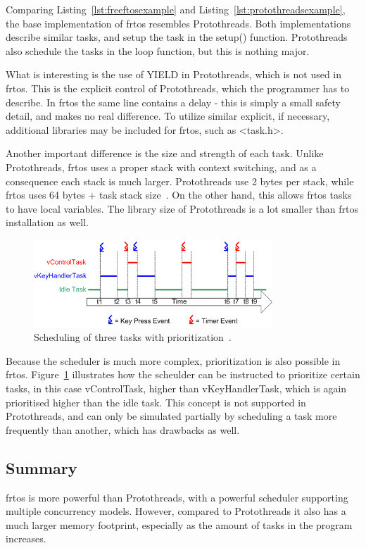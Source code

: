 Comparing Listing~\ref{lst:freeftosexample} and Listing~\ref{lst:protothreadsexample}, the base implementation of \gls{frtos} resembles Protothreads. Both implementations describe similar tasks, and setup the task in the setup() function. Protothreads also schedule the tasks in the loop function, but this is nothing major.

What is interesting is the use of YIELD in Protothreads, which is not used in \gls{frtos}. This is the explicit control of Protothreads, which the programmer has to describe. In \gls{frtos} the same line contains a delay - this is simply a small safety detail, and makes no real difference. To utilize similar explicit, if necessary, additional libraries may be included for \gls{frtos}, such as <task.h>.

Another important difference is the size and strength of each task. Unlike Protothreads, \gls{frtos} uses a proper stack with context switching, and as a consequence each stack is much larger. Protothreads use 2 bytes per stack, while \gls{frtos} uses 64 bytes + task stack size~\cite{AboutRTOS}. On the other hand, this allows \gls{frtos} tasks to have local variables. The library size of Protothreads is a lot smaller than \gls{frtos} installation as well.


\begin{figure}[htbp]
  \centering
  \includegraphics[width=0.8\textwidth]{figures/FreeRTOS_Prioritization.png}
  \caption{Scheduling of three tasks with prioritization~\cite{SchedulingRTOS}.}
  \label{fig:freertosprio}
\end{figure}


Because the scheduler is much more complex, prioritization is also possible in \gls{frtos}. Figure~\ref{fig:freertosprio} illustrates how the scheulder can be instructed to prioritize certain tasks, in this case vControlTask, higher than vKeyHandlerTask, which is again prioritised higher than the idle task. This concept is not supported in Protothreads, and can only be simulated partially by scheduling a task more frequently than another, which has drawbacks as well.


\subsection{Summary}\label{subsec:concurrencysummary}
\gls{frtos} is more powerful than Protothreads, with a powerful scheduler supporting multiple concurrency models. However, compared to Protothreads it also has a much larger memory footprint, especially as the amount of tasks in the program increases.

